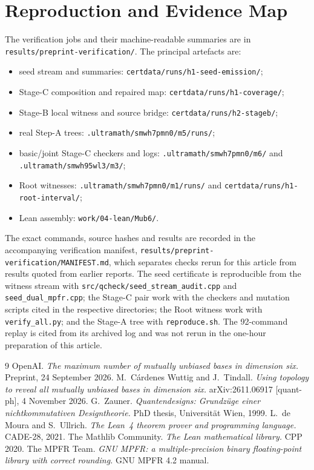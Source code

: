 \documentclass[10pt]{article}
\theoremstyle{definition}
\begin{document}
\section{Reproduction and Evidence Map}

The verification jobs and their machine-readable summaries are in \texttt{results/preprint-verification/}. The principal artefacts are:
\begin{itemize}[leftmargin=1.4em]
\item seed stream and summaries: \texttt{certdata/runs/h1-seed-emission/};
\item Stage-C composition and repaired map: \texttt{certdata/runs/h1-coverage/};
\item Stage-B local witness and source bridge: \texttt{certdata/runs/h2-stageb/};
\item real Step-A trees: \texttt{.ultramath/smwh7pmn0/m5/runs/};
\item basic/joint Stage-C checkers and logs: \texttt{.ultramath/smwh7pmn0/m6/} and \texttt{.ultramath/smwh95wl3/m3/};
\item Root witnesses: \texttt{.ultramath/smwh7pmn0/m1/runs/} and \texttt{certdata/runs/h1-root-interval/};
\item Lean assembly: \texttt{work/04-lean/Mub6/}.
\end{itemize}
The exact commands, source hashes and results are recorded in the accompanying verification manifest, \texttt{results/\allowbreak preprint-verification/\allowbreak MANIFEST.md}, which separates checks rerun for this article from results quoted from earlier reports. The seed certificate is reproducible from the witness stream with \texttt{src/qcheck/\allowbreak seed\_stream\_audit.cpp} and \texttt{seed\_dual\_mpfr.cpp}; the Stage-C pair work with the checkers and mutation scripts cited in the respective directories; the Root witness work with \texttt{verify\_all.py}; and the Stage-A tree with \texttt{reproduce.sh}. The 92-command replay is cited from its archived log and was not rerun in the one-hour preparation of this article.

\begin{thebibliography}{9}
 OpenAI. \emph{The maximum number of mutually unbiased bases in dimension six.} Preprint, 24 September 2026.
 M.~C\'ardenes Wuttig and J.~Tindall. \emph{Using topology to reveal all mutually unbiased bases in dimension six.} arXiv:2611.06917 [quant-ph], 4 November 2026.
 G.~Zauner. \emph{Quantendesigns: Grundz\"uge einer nichtkommutativen Designtheorie.} PhD thesis, Universit\"at Wien, 1999.
 L.~de Moura and S.~Ullrich. \emph{The Lean~4 theorem prover and programming language.} CADE-28, 2021.
 The Mathlib Community. \emph{The Lean mathematical library.} CPP 2020.
 The MPFR Team. \emph{GNU MPFR: a multiple-precision binary floating-point library with correct rounding.} GNU MPFR 4.2 manual.
\end{thebibliography}
\end{document}
